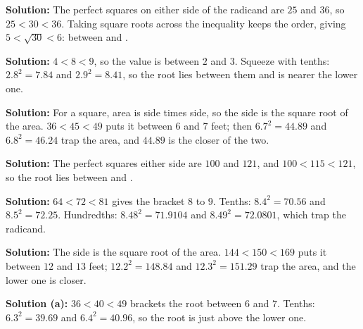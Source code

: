 \documentclass[12pt]{article}
\begin{document}




\textbf{Solution:} \quad The perfect squares on either side of the radicand are $25$ and
$36$, so $25 < 30 < 36$. Taking square roots across the inequality keeps the order, giving
$5 < \sqrt{30} < 6$: between  and .


\textbf{Solution:} \quad $4 < 8 < 9$, so the value is between $2$ and $3$. Squeeze with
tenths: $2.8^2 = 7.84$ and $2.9^2 = 8.41$, so the root lies between them and is nearer the
lower one. 


\textbf{Solution:} \quad For a square, area is side times side, so the side is the square
root of the area. $36 < 45 < 49$ puts it between $6$ and $7$ feet; then $6.7^2 = 44.89$ and
$6.8^2 = 46.24$ trap the area, and $44.89$ is the closer of the two. 


\textbf{Solution:} \quad The perfect squares either side are $100$ and $121$, and
$100 < 115 < 121$, so the root lies between  and .


\textbf{Solution:} \quad $64 < 72 < 81$ gives the bracket $8$ to $9$. Tenths:
$8.4^2 = 70.56$ and $8.5^2 = 72.25$. Hundredths: $8.48^2 = 71.9104$ and
$8.49^2 = 72.0801$, which trap the radicand. 


\textbf{Solution:} \quad The side is the square root of the area. $144 < 150 < 169$ puts it
between $12$ and $13$ feet; $12.2^2 = 148.84$ and $12.3^2 = 151.29$ trap the area, and the
lower one is closer. 


\textbf{Solution (a):} \quad $36 < 40 < 49$ brackets the root between $6$ and $7$.
Tenths: $6.3^2 = 39.69$ and $6.4^2 = 40.96$, so the root is just above the lower one.
\end{document}
